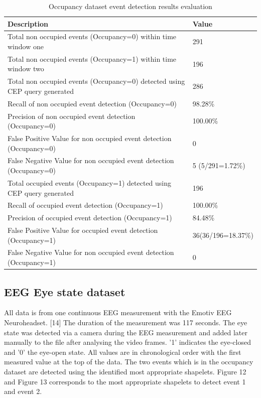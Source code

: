 \documentclass[conference]{IEEEtran}  %
\begin{document}
\begin{table}
\begin{center}
\caption{Occupancy dataset event detection results evaluation}
\begin{tabular}{ | m{6cm} | m{2.3cm}| } 
 \hline 
\textbf{Description} & \textbf{Value}\\
\hline
Total non occupied events (Occupancy=0) within time window one & 291\\
\hline
Total non occupied events (Occupancy=1) within time window two & 196 \\
\hline
Total non occupied events (Occupancy=0) detected using CEP query generated & 286\\
\hline
Recall of non occupied event detection (Occupancy=0) & 98.28\%\\
\hline
Precision of non occupied event detection (Occupancy=0) & 100.00\%\\
\hline
False Positive Value for non occupied event detection (Occupancy=0) & 0\\
\hline
False Negative Value for non occupied event detection (Occupancy=0) & 5 \newline(5/291=1.72\%)\\
\hline
Total occupied events (Occupancy=1) detected using CEP query generated & 196\\ 
 \hline
Recall of occupied event detection (Occupancy=1) & 100.00\%\\
\hline
Precision of occupied event detection (Occupancy=1) & 84.48\%\\
\hline
False Positive Value for occupied event detection (Occupancy=1) & 36\newline(36/196=18.37\%)\\
\hline
False Negative Value for non occupied event detection (Occupancy=1) & 0\\
\hline

\end{tabular}
\end{center}
\end{table}

\subsection{EEG Eye state dataset}
All data is from one continuous EEG measurement with the Emotiv EEG Neuroheadset. [14] The duration of the measurement was 117 seconds. The eye state was detected via a camera during the EEG measurement and added later manually to the file after analysing the video frames. '1' indicates the eye-closed and '0' the eye-open state. All values are in chronological order with the first measured value at the top of the data. The two events which is in the occupancy dataset are detected using the identified most appropriate shapelets. Figure 12 and Figure 13 corresponds to the most appropriate shapelets to detect event 1 and event 2.
\end{document}
